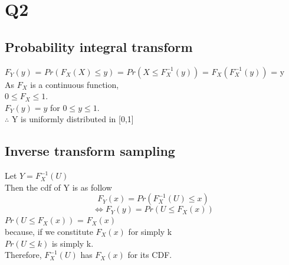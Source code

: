 \documentclass{article}
\begin{document}
\section{Q2}

\subsection{Probability integral transform} 
$F_{Y}(y)$ = $Pr( F_{X}(X) \leq y)$ = $Pr(X \leq F^{-1}_{X}(y))$ = $F_{X}( F^{-1}_{X}(y) )$ = y \\
As $F_{X}$ is a continuous function,\\
$0 \leq F_{X}  \leq 1$.\\
$F_{Y}(y) = y$ for  $0 \leq y \leq 1$.\\
$\therefore$ Y is uniformly distributed in [0,1]\\

\subsection{Inverse transform sampling}
Let $ Y = F^{-1}_{X}(U) $\\
Then the cdf of Y is as follow\\
\[F_{Y}(x) = Pr(F^{-1}_{X}(U) \leq x)\]
\[ \iff F_{Y}(y) = Pr(U \leq F_{X}(x))\]
$Pr(U \leq F_{X}(x))$ = $F_{X}(x)$\\
because, if we constitute $F_{X}(x)$ for simply k\\
$Pr(U \leq k)$ is simply k.\\
Therefore, $F^{-1}_{X}(U)$ has $F_{X}(x)$ for its CDF.
\end{document}
